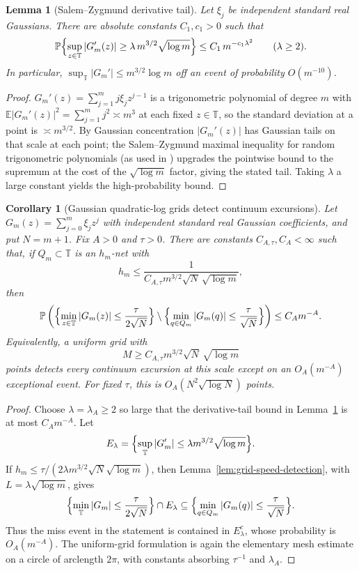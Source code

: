 \documentclass[11pt]{amsart}
\numberwithin{equation}{section}
\newtheorem{corollary}[theorem]{Corollary}
\newtheorem{lemma}[theorem]{Lemma}
\theoremstyle{definition}
\theoremstyle{remark}
\newcommand{\T}{\mathbb T}
\newcommand{\Prob}{\mathbb P}
\newcommand{\Exp}{\mathbb E}
\newcommand{\abs}[1]{\left\lvert #1\right\rvert}
\begin{document}
\begin{lemma}[Salem--Zygmund derivative tail]\label{lem:derivtail}
Let $\xi_j$ be independent standard real Gaussians. There are absolute constants $C_1,c_1>0$ such that
\[
  \Prob\Bigl\{\sup_{z\in\T}\abs{G_m'(z)}\ge \lambda\,m^{3/2}\sqrt{\log m}\Bigr\}\le C_1\,m^{-c_1\lambda^2}\qquad(\lambda\ge2).
\]
In particular, $\sup_\T\abs{G_m'}\le m^{3/2}\log m$ off an event of probability $O(m^{-10})$.
\end{lemma}

\begin{proof}
$G_m'(z)=\sum_{j=1}^m j\xi_j z^{j-1}$ is a trigonometric polynomial of degree $m$ with $\Exp\abs{G_m'(z)}^2=\sum_{j=1}^m j^2\asymp m^3$ at each fixed $z\in\T$, so the standard deviation at a point is $\asymp m^{3/2}$. By Gaussian concentration $\abs{G_m'(z)}$ has Gaussian tails on that scale at each point; the Salem--Zygmund maximal inequality for random trigonometric polynomials (as used in \cite{KMS}) upgrades the pointwise bound to the supremum at the cost of the $\sqrt{\log m}$ factor, giving the stated tail. Taking $\lambda$ a large constant yields the high-probability bound.
\end{proof}

\begin{corollary}[Gaussian quadratic-log grids detect continuum excursions]
\label{cor:gaussian-grid-detects}
Let \(G_m(z)=\sum_{j=0}^m\xi_jz^j\) with independent standard real Gaussian
coefficients, and put \(N=m+1\).  Fix \(A>0\) and \(\tau>0\).  There are
constants \(C_{A,\tau},C_A<\infty\) such that, if \(Q_m\subset\T\) is an
\(h_m\)-net with
\[
  h_m\le \frac{1}{C_{A,\tau}m^{3/2}\sqrt N\,\sqrt{\log m}},
\]
then
\[
  \Prob\left(
    \Bigl\{\min_{z\in\T}\abs{G_m(z)}\le \frac{\tau}{2\sqrt N}\Bigr\}
    \setminus
    \Bigl\{\min_{q\in Q_m}\abs{G_m(q)}\le \frac{\tau}{\sqrt N}\Bigr\}
  \right)
  \le C_A m^{-A}.
\]
Equivalently, a uniform grid with
\[
  M\ge C_{A,\tau}m^{3/2}\sqrt N\,\sqrt{\log m}
\]
points detects every continuum excursion at this scale except on an
\(O_A(m^{-A})\) exceptional event.  For fixed \(\tau\), this is
\(O_A(N^2\sqrt{\log N})\) points.
\end{corollary}

\begin{proof}
Choose \(\lambda=\lambda_A\ge2\) so large that the derivative-tail bound in
Lemma~\ref{lem:derivtail} is at most \(C_A m^{-A}\).  Let
\[
  E_\lambda=\Bigl\{\sup_{\T}\abs{G_m'}\le
     \lambda m^{3/2}\sqrt{\log m}\Bigr\}.
\]
If \(h_m\le \tau/(2\lambda m^{3/2}\sqrt N\sqrt{\log m})\), then
Lemma~\ref{lem:grid-speed-detection}, with \(L=\lambda\sqrt{\log m}\), gives
\[
  \Bigl\{\min_{\T}\abs{G_m}\le \frac{\tau}{2\sqrt N}\Bigr\}
  \cap E_\lambda
  \subseteq
  \Bigl\{\min_{q\in Q_m}\abs{G_m(q)}\le \frac{\tau}{\sqrt N}\Bigr\}.
\]
Thus the miss event in the statement is contained in \(E_\lambda^c\), whose
probability is \(O_A(m^{-A})\).  The uniform-grid formulation is again the
elementary mesh estimate on a circle of arclength \(2\pi\), with constants
absorbing \(\tau^{-1}\) and \(\lambda_A\).
\end{proof}
\end{document}
